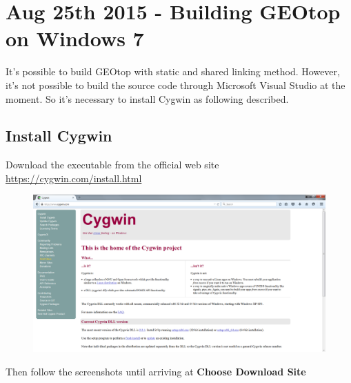 \section{Aug 25th 2015 - Building GEOtop on Windows 7}\label{sec:20150825}

It's possible to build GEOtop with static and shared linking method. However, it's not possible to build the source code through Microsoft Visual Studio at the moment. So it's necessary to install Cygwin as following described.

\subsection{Install Cygwin}

Download the executable from the official web site \url{https://cygwin.com/install.html}

\begin{figure}[h!]
  \includegraphics[width=\linewidth]{2015/Aug/25/1pic.png}
\end{figure}

Then follow the screenshots until arriving at \textbf{Choose Download Site}

\pagebreak

